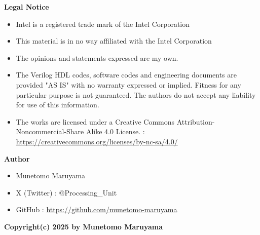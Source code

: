 \begin{table}[H]
\end{table}

\null\vfill
\textbf{Legal Notice}
\begin{itemize}
    \item Intel is a registered trade mark of the Intel Corporation
    \item This material is in no way affiliated with the Intel Corporation
    \item The opinions and statements expressed are my own.
    \item The Verilog HDL codes, software codes and engineering documents are provided "AS IS" with no warranty expressed or implied. Fitness for any particular purpose is not guaranteed. The authors do not accept any liability for use of this information.
    \item The works are licensed under a Creative Commons Attribution-Noncommercial-Share Alike 4.0 License. : \url{https://creativecommons.org/licenses/by-nc-sa/4.0/}
\end{itemize}

\textbf{Author}
\begin{itemize}
    \item Munetomo Maruyama
    \item X (Twitter) : @Processing\_Unit
    \item GitHub : \url{https://github.com/munetomo-maruyama}
\end{itemize}

\centerline{\textbf{Copyright(c) 2025 by Munetomo Maruyama}}


